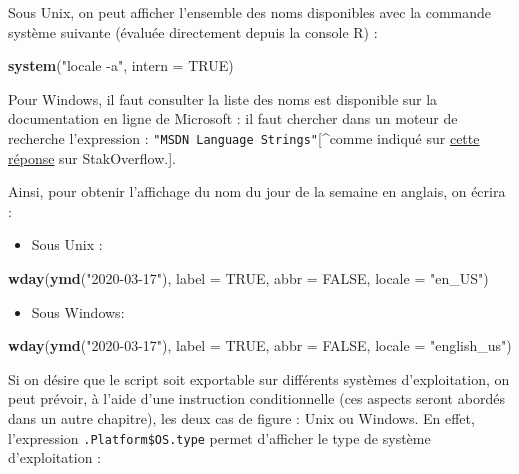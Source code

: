 \documentclass[
  11pt,
]{book}
\newenvironment{Shaded}{\begin{snugshade}}{\end{snugshade}}
\newcommand{\DataTypeTok}[1]{\textcolor[rgb]{0.13,0.29,0.53}{#1}}
\newcommand{\KeywordTok}[1]{\textcolor[rgb]{0.13,0.29,0.53}{\textbf{#1}}}
\newcommand{\NormalTok}[1]{#1}
\newcommand{\OtherTok}[1]{\textcolor[rgb]{0.56,0.35,0.01}{#1}}
\newcommand{\StringTok}[1]{\textcolor[rgb]{0.31,0.60,0.02}{#1}}
\providecommand{\tightlist}{%
  \setlength{\itemsep}{0pt}\setlength{\parskip}{0pt}}
\numberwithin{equation}{section}
\numberwithin{countremarque}{section}
\begin{document}
Sous Unix, on peut afficher l'ensemble des noms disponibles avec la commande système suivante (évaluée directement depuis la console R) :

\begin{Shaded}
\begin{Highlighting}[]
\KeywordTok{system}\NormalTok{(}\StringTok{"locale {-}a"}\NormalTok{, }\DataTypeTok{intern =} \OtherTok{TRUE}\NormalTok{)}
\end{Highlighting}
\end{Shaded}

Pour Windows, il faut consulter la liste des noms est disponible sur la documentation en ligne de Microsoft : il faut chercher dans un moteur de recherche l'expression : \texttt{"MSDN\ Language\ Strings"}{[}\^{}comme indiqué sur \href{https://stackoverflow.com/a/26604195}{cette réponse} sur StakOverflow.{]}.

Ainsi, pour obtenir l'affichage du nom du jour de la semaine en anglais, on écrira :

\begin{itemize}
\tightlist
\item
  Sous Unix :
\end{itemize}

\begin{Shaded}
\begin{Highlighting}[]
\KeywordTok{wday}\NormalTok{(}\KeywordTok{ymd}\NormalTok{(}\StringTok{"2020{-}03{-}17"}\NormalTok{), }\DataTypeTok{label =} \OtherTok{TRUE}\NormalTok{, }\DataTypeTok{abbr =} \OtherTok{FALSE}\NormalTok{,}
     \DataTypeTok{locale =} \StringTok{"en\_US"}\NormalTok{)}
\end{Highlighting}
\end{Shaded}

\begin{itemize}
\tightlist
\item
  Sous Windows:
\end{itemize}

\begin{Shaded}
\begin{Highlighting}[]
\KeywordTok{wday}\NormalTok{(}\KeywordTok{ymd}\NormalTok{(}\StringTok{"2020{-}03{-}17"}\NormalTok{), }\DataTypeTok{label =} \OtherTok{TRUE}\NormalTok{, }\DataTypeTok{abbr =} \OtherTok{FALSE}\NormalTok{,}
     \DataTypeTok{locale =} \StringTok{"english\_us"}\NormalTok{)}
\end{Highlighting}
\end{Shaded}

Si on désire que le script soit exportable sur différents systèmes d'exploitation, on peut prévoir, à l'aide d'une instruction conditionnelle (ces aspects seront abordés dans un autre chapitre), les deux cas de figure : Unix ou Windows. En effet, l'expression \texttt{.Platform\$OS.type} permet d'afficher le type de système d'exploitation :
\end{document}
